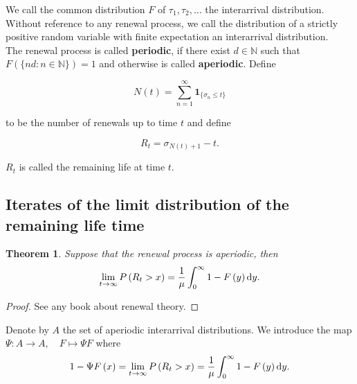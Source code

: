 \documentclass[12pt,a4paper]{scrartcl}
\newtheorem{theorem}{Theorem}[section]
\numberwithin{equation}{section}
\newcommand{\N}{\mathbb{N}} %
\begin{document}
We call the common distribution $ F $ of $\tau_1, \tau_2, \ldots $ the interarrival distribution. Without reference to any renewal process, we call the distribution of a strictly positive random variable with finite expectation an interarrival distribution.\\[2ex]

The renewal process is called \textbf{periodic}, if there exist $ d \in \N $ such that $ F\left(\lbrace nd : n \in \N \rbrace \right) = 1 $ and otherwise is called \textbf{aperiodic}. Define


$$ N\left(t\right) = \sum_{n = 1}^{\infty} \textbf{1}_{\lbrace \sigma_n \leq t\rbrace } $$

to be the number of renewals up to time $t$ and define

$$ R_t = \sigma_{N\left(t\right)+1} - t. $$

$R_t$ is called the remaining life at time $t.$

\subsection{Iterates of the limit distribution of the remaining life time}
\begin{theorem}
Suppose that the renewal process is aperiodic, then
\begin{equation}
\lim_{t \to \infty} P\left(R_t > x\right) = \frac{1}{\mu} \int_{0}^{\infty} 1- F\left(y\right) \textnormal{d}y.
\end{equation}
\end{theorem}
\begin{proof}
See any book about renewal theory.
\end{proof}

Denote by $ A $ the set of aperiodic interarrival distributions. We introduce the map $\Psi : A \to A, \quad F \mapsto \Psi F$ where 
\begin{equation}
\label{eq:remaininglife}
1 - \Psi F\left(x\right) = \lim_{t \to \infty} P\left(R_t > x\right) = \frac{1}{\mu} \int_{0}^{\infty} 1- F\left(y\right) \textnormal{d}y.
\end{equation}
\end{document}
